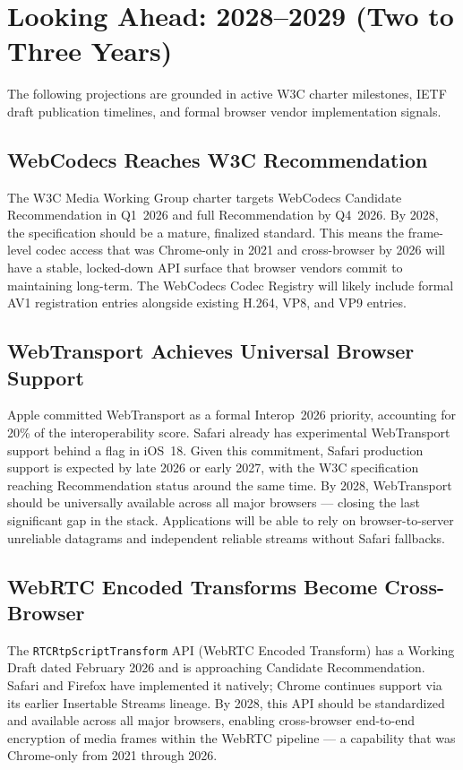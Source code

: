 \documentclass[11pt]{article}
\begin{document}
\section{Looking Ahead: 2028--2029 (Two to Three Years)}

The following projections are grounded in active W3C charter milestones, IETF
draft publication timelines, and formal browser vendor implementation signals.

\subsection{WebCodecs Reaches W3C Recommendation}

The W3C Media Working Group charter targets WebCodecs Candidate
Recommendation in Q1~2026 and full Recommendation by Q4~2026. By 2028, the
specification should be a mature, finalized standard. This means the
frame-level codec access that was Chrome-only in 2021 and cross-browser by
2026 will have a stable, locked-down API surface that browser vendors commit
to maintaining long-term. The WebCodecs Codec Registry will likely include
formal AV1 registration entries alongside existing H.264, VP8, and VP9
entries.

\subsection{WebTransport Achieves Universal Browser Support}

Apple committed WebTransport as a formal Interop~2026 priority, accounting
for 20\% of the interoperability score. Safari already has experimental
WebTransport support behind a flag in iOS~18. Given this commitment, Safari
production support is expected by late 2026 or early 2027, with the W3C
specification reaching Recommendation status around the same time. By 2028,
WebTransport should be universally available across all major browsers ---
closing the last significant gap in the stack. Applications will be able to
rely on browser-to-server unreliable datagrams and independent reliable
streams without Safari fallbacks.

\subsection{WebRTC Encoded Transforms Become Cross-Browser}

The \texttt{RTCRtpScriptTransform} API (WebRTC Encoded Transform) has a
Working Draft dated February 2026 and is approaching Candidate
Recommendation. Safari and Firefox have implemented it natively; Chrome
continues support via its earlier Insertable Streams lineage. By 2028, this
API should be standardized and available across all major browsers, enabling
cross-browser end-to-end encryption of media frames within the WebRTC
pipeline --- a capability that was Chrome-only from 2021 through 2026.
\end{document}
